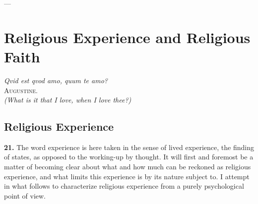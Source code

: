 \documentclass[12pt,a4paper]{book}
\newcommand{\opage}[1]{\marginnote{\footnotesize\textit{[#1]}}}
\begin{document}
\begin{center}---\end{center}

\section{Religious Experience and Religious Faith}
\label{sec:experience-faith}

\begin{flushright}
\opage{55}
\textit{Qvid est qvod amo, quum te amo?}\\[2pt]
\textsc{Augustine}.\\[2pt]
\textit{(What is it that I love, when I love thee?)}
\end{flushright}

\bigskip

\subsection{Religious Experience}
\label{ssec:experience}

\noindent\textbf{21.} The word experience is here taken in the sense of
lived experience, the finding of states, as opposed to the working-up by
thought. It will first and foremost be a matter of becoming clear about what
and how much can be reckoned as religious experience, and what limits this
experience is by its nature subject to. I attempt in what follows to
characterize religious experience from a purely psychological point of view.

\medskip
\end{document}
